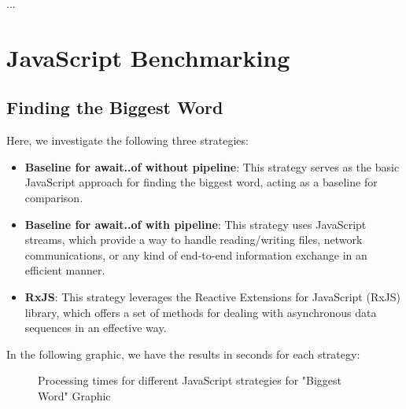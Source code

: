     \clearpage
... 


\section{JavaScript Benchmarking}
\label{sec:js_implementation}


\subsection{Finding the Biggest Word}
\label{subsec:biggest_word_js}

Here, we investigate the following three strategies:

\begin{itemize}
    \item \textbf{Baseline for await..of without pipeline}: This strategy serves as the basic JavaScript approach for finding the biggest word, acting as a baseline for comparison.
    \item \textbf{Baseline for await..of with pipeline}: This strategy uses JavaScript streams, which provide a way to handle reading/writing files, network communications, or any kind of end-to-end information exchange in an efficient manner.
    \item \textbf{RxJS}: This strategy leverages the Reactive Extensions for JavaScript (RxJS) library, which offers a set of methods for dealing with asynchronous data sequences in an effective way.
\end{itemize}


In the following graphic, we have the results in seconds for each strategy:


\begin{figure}[H]
    \raggedright
    \caption{Processing times for different JavaScript strategies for "Biggest Word" Graphic}
    \label{fig:biggest_word_processing_times_js}
\end{figure}

